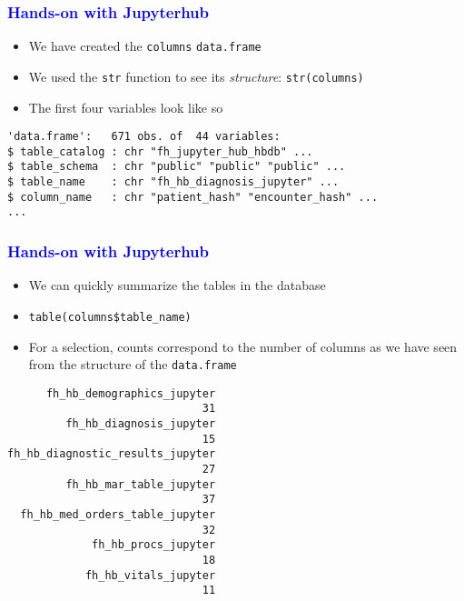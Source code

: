 \documentclass[11pt,pdftex,dvipsnames,usenames]{beamer}
\begin{document}
\begin{frame}[fragile]\frametitle{\bf\textcolor{blue}{Hands-on with Jupyterhub}}
\begin{itemize}
\item We have created the \texttt{columns} \texttt{data.frame}
\item We used the \texttt{str} function to see its {\it structure}: \texttt{str(columns)}
\item The first four variables look like so
\end{itemize}
\begin{verbatim}
'data.frame':	671 obs. of  44 variables:
$ table_catalog : chr "fh_jupyter_hub_hbdb" ...
$ table_schema  : chr "public" "public" "public" ...
$ table_name    : chr "fh_hb_diagnosis_jupyter" ...
$ column_name   : chr "patient_hash" "encounter_hash" ...
...
\end{verbatim}
\end{frame}


\begin{frame}[fragile]\frametitle{\bf\textcolor{blue}{Hands-on with Jupyterhub}}
\begin{itemize}
\item We can quickly summarize the tables in the database
\item \texttt{table(columns\$table\_name)}
\item For a selection, counts correspond to the number of columns as we have seen from the structure of the \texttt{data.frame}
\end{itemize}
\begin{verbatim}
      fh_hb_demographics_jupyter          
                              31
         fh_hb_diagnosis_jupyter 
                              15 
fh_hb_diagnostic_results_jupyter
                              27
         fh_hb_mar_table_jupyter
                              37
  fh_hb_med_orders_table_jupyter 
                              32 
             fh_hb_procs_jupyter
                              18 
            fh_hb_vitals_jupyter 
                              11 
\end{verbatim}
\end{frame}
\end{document}
